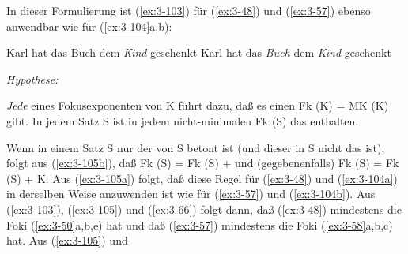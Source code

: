 \documentclass[output=paper]{langsci/langscibook}
\begin{document}
In dieser Formulierung ist (\ref{ex:3-103}) für (\ref{ex:3-48}) und (\ref{ex:3-57}) ebenso anwendbar
wie für (\ref{ex:3-104}a,b):
\begin{exe}
\ex
\label{ex:3-104}
\begin{xlist}
\ex
\label{ex:3-104a}
Karl hat das Buch dem \textit{Kind} geschenkt
\ex
\label{ex:3-104b}
Karl hat das \textit{Buch} dem \textit{Kind} geschenkt
\end{xlist}
\ex
\label{ex:3-105}
\textit{Hypothese:}
\begin{xlist}
\ex
\label{ex:3-105a}
\emph{Jede}  eines Fokusexponenten von K führt dazu, daß es einen Fk (K) = MK (K) gibt.
\ex
\label{ex:3-105b}
In jedem Satz S ist in jedem nicht-minimalen  Fk (S) das  enthalten.
\end{xlist}
\end{exe}
Wenn in einem Satz S nur der  von S betont ist (und
dieser in S nicht das  ist), folgt aus (\ref{ex:3-105b}), daß
Fk (S) = Fk (S) +  und (gegebenenfalls) Fk
(S) = Fk (S) + K. Aus (\ref{ex:3-105a}) folgt, daß diese
Regel für (\ref{ex:3-48}) und (\ref{ex:3-104a}) in derselben Weise
anzuwenden ist wie für (\ref{ex:3-57}) und (\ref{ex:3-104b}). Aus
(\ref{ex:3-103}), (\ref{ex:3-105}) und (\ref{ex:3-66}) folgt dann, daß
(\ref{ex:3-48}) mindestens die Foki (\ref{ex:3-50}a,b,e) hat und daß (\ref{ex:3-57}) mindestens die Foki
(\ref{ex:3-58}a,b,c) hat. Aus
(\ref{ex:3-105}) und
\begin{exe}

\end{exe}
\end{document}
